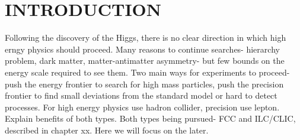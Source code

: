 \chapter{INTRODUCTION}

Following the discovery of the Higgs, there is no clear direction in which high erngy physics should proceed. Many reasons to continue searches- hierarchy problem, dark matter, matter-antimatter asymmetry- but few bounds on the energy scale required to see them. Two main ways for experiments to proceed- push the energy frontier to search for high mass particles, push the precision frontier to find small deviations from the standard model or hard to detect processes. For high energy physics use hadron collider, precision use lepton. Explain benefits of both types. Both types being pursued- FCC and ILC/CLIC, described in chapter xx. Here we will focus on the later.

